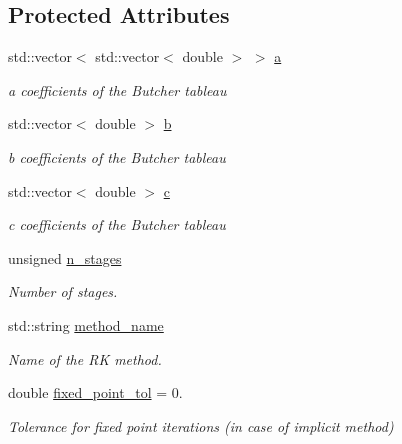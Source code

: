\subsection*{Protected Attributes}
\begin{DoxyCompactItemize}
\item 
\mbox{\label{classRKSolver_ac5db53f1709b9db57f5ac9f41b54aa56}} 
std\+::vector$<$ std\+::vector$<$ double $>$ $>$ \hyperlink{classRKSolver_ac5db53f1709b9db57f5ac9f41b54aa56}{a}
\begin{DoxyCompactList}\small\item\em a coefficients of the Butcher tableau \end{DoxyCompactList}\item 
\mbox{\label{classRKSolver_a205a66e4ac1d479de5d7e0677ae32783}} 
std\+::vector$<$ double $>$ \hyperlink{classRKSolver_a205a66e4ac1d479de5d7e0677ae32783}{b}
\begin{DoxyCompactList}\small\item\em b coefficients of the Butcher tableau \end{DoxyCompactList}\item 
\mbox{\label{classRKSolver_af8ae228652ea669839fe260398057724}} 
std\+::vector$<$ double $>$ \hyperlink{classRKSolver_af8ae228652ea669839fe260398057724}{c}
\begin{DoxyCompactList}\small\item\em c coefficients of the Butcher tableau \end{DoxyCompactList}\item 
\mbox{\label{classRKSolver_adccead9bf0b1c26a25a073b05f25cc76}} 
unsigned \hyperlink{classRKSolver_adccead9bf0b1c26a25a073b05f25cc76}{n\+\_\+stages}
\begin{DoxyCompactList}\small\item\em Number of stages. \end{DoxyCompactList}\item 
\mbox{\label{classRKSolver_af0635d0dae01c89746b582796784794a}} 
std\+::string \hyperlink{classRKSolver_af0635d0dae01c89746b582796784794a}{method\+\_\+name}
\begin{DoxyCompactList}\small\item\em Name of the RK method. \end{DoxyCompactList}\item 
\mbox{\label{classRKSolver_aae528768265579a7c5b5cc5466114c82}} 
double \hyperlink{classRKSolver_aae528768265579a7c5b5cc5466114c82}{fixed\+\_\+point\+\_\+tol} = 0.
\begin{DoxyCompactList}\small\item\em Tolerance for fixed point iterations (in case of implicit method) \end{DoxyCompactList}\end{DoxyCompactItemize}


